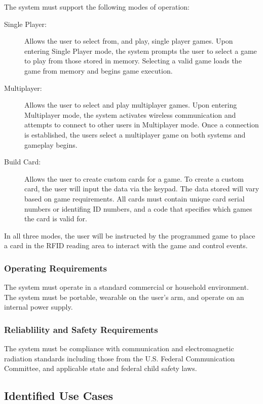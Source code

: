 \documentclass[12pt]{article} %
\begin{document}
The system must support the following modes of operation:

\begin{description}
	\item[Single Player:] Allows the user to select from, and play, single player
		games. Upon entering Single Player mode, the system prompts the user to
		select a game to play from those stored in memory. Selecting a valid game
		loads the game from memory and begins game execution.
	\item[Multiplayer:] Allows the user to select and play multiplayer games.
		Upon entering Multiplayer mode, the system activates wireless communication
		and attempts to connect to other users in Multiplayer mode. Once a
		connection is established, the users select a multiplayer game on both
		systems and gameplay begins.
	\item[Build Card:] Allows the user to create custom cards for a game. To
		create a custom card, the user will input the data via the keypad. The data
		stored will vary based on game requirements. All cards must contain unique
		card serial numbers or identifing ID numbers, and a code that specifies
		which games the card is valid for.
\end{description}

In all three modes, the user will be instructed by the programmed game to place
a card in the RFID reading area to interact with the game and control events. 

\subsubsection{Operating Requirements}

The system must operate in a standard commercial or household environment. The system must be portable, wearable on the user's arm, and operate on an internal power supply.

\subsubsection{Reliablility and Safety Requirements}

The system must be compliance with communication and electromagnetic radiation
standards including those from the U.S. Federal Communication Committee, and
applicable state and federal child safety laws.

\subsection{Identified Use Cases}\label{sec:identifiedUseCases} %
\end{document}
